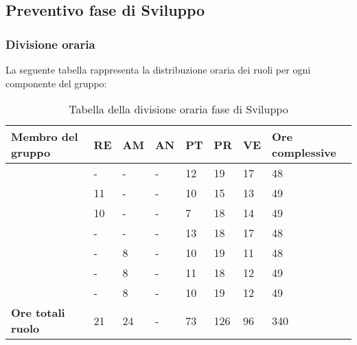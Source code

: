 \subsection{Preventivo fase di Sviluppo}

\subsubsection{Divisione oraria}
La seguente tabella rappresenta la distribuzione oraria dei ruoli per ogni componente del gruppo:
{
	\renewcommand{\arraystretch}{2}
	\begin{longtable}[h!] { C{3.5cm} C{1cm} C{1cm} C{1cm} C{1cm} C{1cm} C{1cm} C{2cm}}
	\caption{Tabella della divisione oraria fase di Sviluppo}\\
	\rowcolor{\primaryColor}
	
	\textcolor{\secondaryColor}{\textbf{Membro del gruppo}} & 
	\textcolor{\secondaryColor}{\textbf{RE}} & 
	\textcolor{\secondaryColor}{\textbf{AM}} & 
	\textcolor{\secondaryColor}{\textbf{AN}} & 
	\textcolor{\secondaryColor}{\textbf{PT}} & 
	\textcolor{\secondaryColor}{\textbf{PR}} & 
	\textcolor{\secondaryColor}{\textbf{VE}} & 
	\textcolor{\secondaryColor}{\textbf{Ore complessive}}\\	
	\endhead
	
	\AW{}                     & - & - & - & 12 & 19 & 17 & 48 \\
	\AT{}                     & 11 & - & - & 10 & 15 & 13 & 49 \\
	\AD{}                     & 10 & - & - & 7 & 18 & 14 & 49 \\
	\EC{}                     & - & - & - & 13 & 18 & 17 & 48 \\
	\EM{}                     & - & 8 & - & 10 & 19 & 11 & 48 \\
	\FP{}                     & - & 8 & - & 11 & 18 & 12 & 49 \\
	\GG{}                     & - & 8 & - & 10 & 19 & 12 & 49 \\
	\textbf{Ore totali ruolo} & 21 & 24 & - & 73 & 126 & 96 & 340\\
	
	\end{longtable}
}

